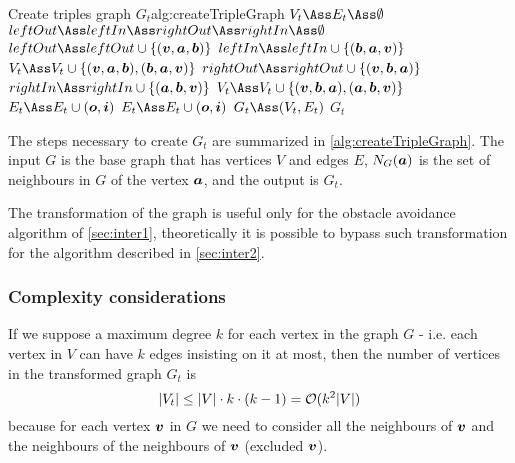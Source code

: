 \documentclass[dissertation.tex]{subfiles}
\begin{document}
\begin{algo}{Create triples graph $G_t$}{alg:createTripleGraph}
  \State $V_t\Ass E_t\Ass \emptyset$
  \label{ln:tripleFor0}
  \State $leftOut\Ass leftIn\Ass rightOut\Ass rightIn\Ass \emptyset$
  \State $leftOut \Ass leftOut\cup \{(\ve{v},\ve{a},\ve{b})\}$
  \State $leftIn \Ass leftIn\cup \{(\ve{b},\ve{a},\ve{v})\}$
  \State $V_t \Ass V_t\cup \{(\ve{v},\ve{a},\ve{b}), (\ve{b},\ve{a},\ve{v})\}$
  \EndFor
  \State $rightOut \Ass rightOut\cup \{(\ve{v},\ve{b},\ve{a})\}$
  \State $rightIn \Ass rightIn\cup \{(\ve{a},\ve{b},\ve{v})\}$
  \State $V_t \Ass V_t\cup \{(\ve{v},\ve{b},\ve{a}), (\ve{a},\ve{b},\ve{v})\}$
  \EndFor
  \label{ln:tripleFor1}
  \State $E_t \Ass E_t\cup (\ve{o},\ve{i})$
  \EndFor
  \EndFor
  \label{ln:tripleFor2}
  \State $E_t \Ass E_t\cup (\ve{o},\ve{i})$
  \EndFor
  \EndFor
  \EndFor
  \State $G_t\Ass(V_t,E_t)$
  \State\Return $G_t$
  \EndFunction
\end{algo}
The steps necessary to create $G_t$ are summarized in
\cref{alg:createTripleGraph}. The input $G$ is the base graph
that has vertices $V$ and edges $E$, $N_G(\boldsymbol{a})$ is the set of
neighbours in $G$ of the vertex $\boldsymbol{a}$, and the output is $G_t$.

The transformation of the graph is useful only for the obstacle
avoidance algorithm of
\cref{sec:inter1}, theoretically it is possible to bypass such
transformation for the algorithm described in \cref{sec:inter2}.

\subsubsection{Complexity considerations}
If we suppose a maximum degree $k$ for each vertex in the graph $G$ -
i.e. each vertex in $V$ can have $k$ edges insisting on
it at most, then the number of vertices in the transformed graph $G_t$ is 
\begin{equation}
  \label{eq:numTriples}
  |V_t|\leq |V|\cdot k\cdot(k-1)=\mathcal{O}(k^2|V|)
\end{equation}
because for each vertex $\boldsymbol{v}$ in $G$ we need to
consider all the neighbours of $\boldsymbol{v}$ and the neighbours of the neighbours
of $\boldsymbol{v}$ (excluded $\boldsymbol{v}$).
\end{document}
